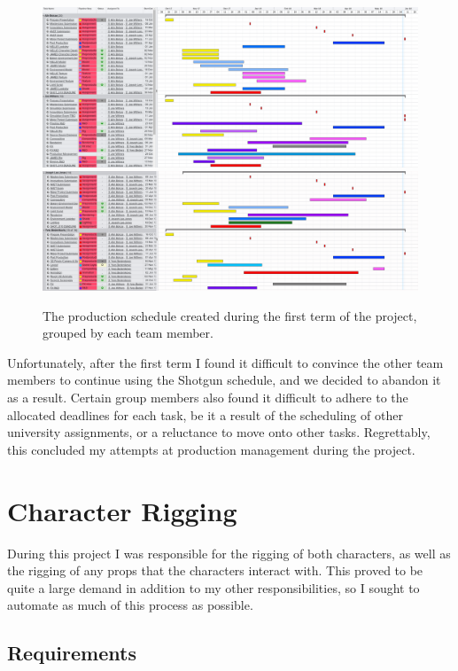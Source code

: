 \documentclass[11pt]{article}
\begin{document}
\begin{figure}[htbp]
\centering
\includegraphics[width=1.0\linewidth]{images/schedule01.png}
\includegraphics[width=1.0\linewidth]{images/schedule02.png}
\caption{\label{figure:schedule} The production schedule created during the first term of the project, grouped by each team member.}
\end{figure}

Unfortunately, after the first term I found it difficult to convince the other team members to continue using the Shotgun schedule, and we decided to abandon it as a result. Certain group members also found it difficult to adhere to the allocated deadlines for each task, be it a result of the scheduling of other university assignments, or a reluctance to move onto other tasks. Regrettably, this concluded my attempts at production management during the project.

\section{Character Rigging}

During this project I was responsible for the rigging of both characters, as well as the rigging of any props that the characters interact with. This proved to be quite a large demand in addition to my other responsibilities, so I sought to automate as much of this process as possible.

\subsection{Requirements}
\end{document}
